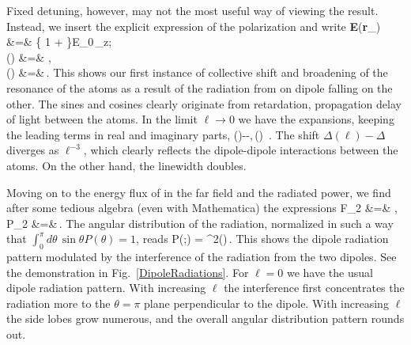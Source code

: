 Fixed detuning, however, may not the most useful way of viewing the result. Instead, we insert the explicit expression of the polarization and write
\bea
{\bf E}({\bf r}_\pm) &=& \left\{
1 + 
\right\}E_0\,_z;\\
\Delta(\ell) &=&    \gamma,\nonumber\\
\gamma(\ell) &=&\gamma \,.
\label{GAMMAL}
\eea
This shows our first instance of collective shift and broadening of the resonance of the atoms as a result of the radiation from on dipole falling on the other. The sines and cosines clearly originate from retardation, propagation delay of light between the atoms. In the limit $\ell\rightarrow0$ we have the expansions, keeping the leading terms in real and imaginary parts,
\beq
\Delta(\ell)-\Delta \simeq -,\,\gamma(\ell) \gamma\,.
\eeq
The shift $\Delta(\ell)-\Delta$ diverges as  $\ell^{-3}$, which clearly reflects the dipole-dipole interactions between the atoms. On the other hand, the linewidth doubles.

Moving on to the energy flux of in the far field and the radiated power, we find after some tedious algebra (even with Mathematica) the expressions
\bea
F_2 &=& ,\\
P_2 &=&\,.
\eea
The angular distribution of the radiation, normalized in such a way that $\int_0^\pi d\theta\,\sin\theta P(\theta)=1$, reads
\beq
P(\theta;\ell) = \frac{3\gamma}{2\gamma(\ell)} \sin ^2(\theta )\,.
\eeq
This shows the dipole radiation pattern modulated by the interference of the radiation from the two dipoles. See the demonstration in Fig.~\ref{DipoleRadiations}. For $\ell=0$ we have the usual dipole radiation pattern. With increasing $\ell$ the interference first concentrates the radiation more to the $\theta=\pi$ plane perpendicular to the dipole. With increasing $\ell$ the side lobes grow numerous, and the overall angular distribution pattern rounds out.

